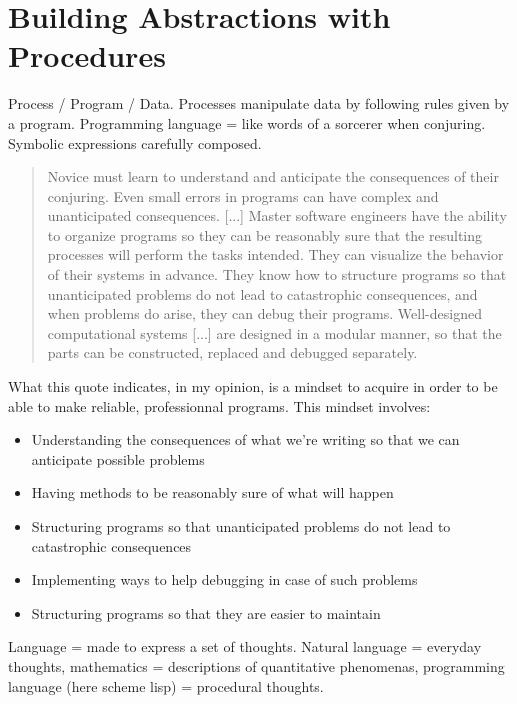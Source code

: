 \chapter{Building Abstractions with Procedures}

\par Process / Program / Data. Processes manipulate data by following rules given by a program. Programming language = like words of a sorcerer when conjuring. Symbolic expressions carefully composed.\\

\begin{quote}
Novice must learn to understand and anticipate the consequences of their conjuring. Even small errors in programs can have complex and unanticipated consequences. [...] Master software engineers have the ability to organize programs so they can be reasonably sure that the resulting processes will perform the tasks intended. They can visualize the behavior of their systems in advance. They know how to structure programs so that unanticipated problems do not lead to catastrophic consequences, and when problems do arise, they can debug their programs. Well-designed computational systems [...] are designed in a modular manner, so that the parts can be constructed, replaced and debugged separately.\cite{SICP}
\end{quote}

What this quote indicates, in my opinion, is a mindset to acquire in order to be able to make reliable, professionnal programs. This mindset involves:

\begin{itemize}
\item Understanding the consequences of what we're writing so that we can anticipate possible problems
\item Having methods to be reasonably sure of what will happen
\item Structuring programs so that unanticipated problems do not lead to catastrophic consequences
\item Implementing ways to help debugging in case of such problems
\item Structuring programs so that they are easier to maintain
\end{itemize}

\par Language = made to express a set of thoughts. Natural language = everyday thoughts, mathematics = descriptions of quantitative phenomenas, programming language (here scheme lisp) = procedural thoughts.\\

